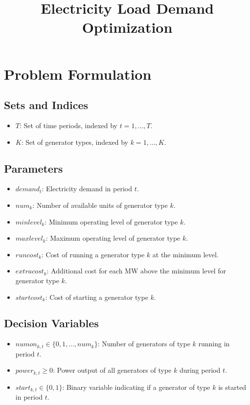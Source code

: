 \documentclass{article}
\begin{document}
\title{Electricity Load Demand Optimization}
\author{}
\date{}
\maketitle

\section{Problem Formulation}

\subsection{Sets and Indices}
\begin{itemize}
    \item $T$: Set of time periods, indexed by $t = 1, \ldots, T$.
    \item $K$: Set of generator types, indexed by $k = 1, \ldots, K$.
\end{itemize}

\subsection{Parameters}
\begin{itemize}
    \item $demand_t$: Electricity demand in period $t$.
    \item $num_k$: Number of available units of generator type $k$.
    \item $minlevel_k$: Minimum operating level of generator type $k$.
    \item $maxlevel_k$: Maximum operating level of generator type $k$.
    \item $runcost_k$: Cost of running a generator type $k$ at the minimum level.
    \item $extracost_k$: Additional cost for each MW above the minimum level for generator type $k$.
    \item $startcost_k$: Cost of starting a generator type $k$.
\end{itemize}

\subsection{Decision Variables}
\begin{itemize}
    \item $numon_{k,t} \in \{0, 1, \ldots, num_k\}$: Number of generators of type $k$ running in period $t$.
    \item $power_{k,t} \geq 0$: Power output of all generators of type $k$ during period $t$.
    \item $start_{k,t} \in \{0, 1\}$: Binary variable indicating if a generator of type $k$ is started in period $t$.
\end{itemize}
\end{document}
